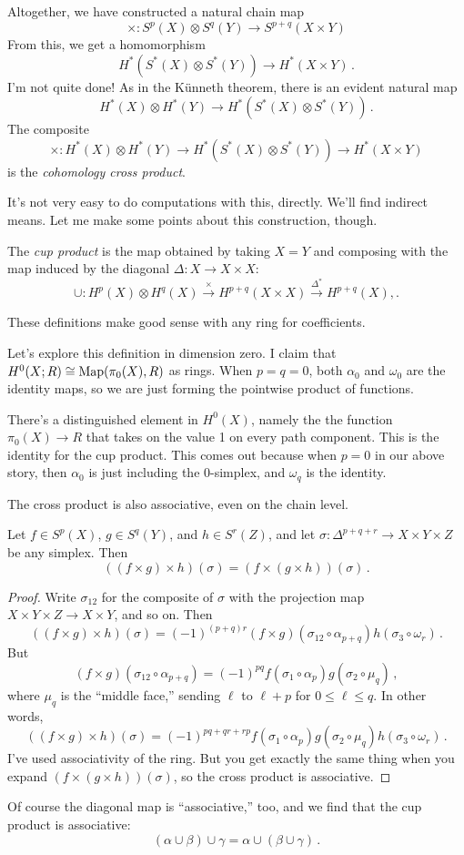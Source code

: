 Altogether, we have constructed a natural chain map
\[
\times:S^p(X)\otimes S^q(Y)\to S^{p+q}(X\times Y)
\]
From this, we get a homomorphism
\[
H^\ast(S^\ast(X)\otimes S^\ast(Y))\to H^\ast(X\times Y)\,.
\]
I'm not quite done! As in the K\"unneth theorem, there is an evident natural 
map 
\[
 H^\ast(X)\otimes H^\ast(Y)\to H^\ast(S^\ast(X)\otimes S^\ast(Y))\,.
\] 
The composite
\[
\times:H^\ast(X)\otimes H^\ast(Y)\to H^\ast(S^\ast(X)\otimes S^\ast(Y))\to H^\ast(X\times Y)
\]
 is the {\em cohomology cross product}.

It's not very easy to do computations with this, directly. We'll find indirect means. Let me make some points about this construction, though.
\begin{definition}
The {\em cup product} is the map obtained by taking $X=Y$ and composing with
the map induced by the diagonal $\Delta:X\to X\times X$:
\[
\cup:H^p(X)\otimes H^q(X)\xrightarrow{\times} H^{p+q}(X\times X)\xrightarrow{\Delta^\ast} H^{p+q}(X),.
\]
\end{definition}
These definitions make good sense with any ring for coefficients.

Let's explore this definition in dimension zero. 
I claim that $ H^0(X;R)\cong\operatorname{Map}(\pi_0(X),R)$ as rings. When $p=q=0$, both $\alpha_0$ and $\omega_0$ are the identity maps, so we are just forming the 
pointwise product of functions. 

There's a distinguished element in $H^0(X)$, namely the the function $\pi_0(X)\to R$ that takes on the value 1 on every path component. 
This is the identity for the cup product. This comes out because when $p=0$ in our above story, then $\alpha_0$ is just including the $0$-simplex, and $\omega_q$ is the identity. 

The cross product is also associative, even on the chain level. 
\begin{prop}
Let $f\in S^p(X)$, $g\in S^q(Y)$, and $h\in S^r(Z)$, and let 
$\sigma:\Delta^{p+q+r}\to X\times Y\times Z$ be any simplex. Then
\[
((f\times g)\times h)(\sigma)=(f\times(g\times h))(\sigma)\,.
\]
\end{prop}
\begin{proof}
Write $\sigma_{12}$ for the composite of $\sigma$ with the projection map
$X\times Y\times Z\to X\times Y$, and so on. Then
\[
((f\times g)\times h)(\sigma)=(-1)^{(p+q)r}
(f\times g)(\sigma_{12}\circ\alpha_{p+q})h(\sigma_3\circ\omega_r)\,.
\]
But 
\[(f\times g)(\sigma_{12}\circ\alpha_{p+q})=(-1)^{pq}
f(\sigma_1\circ\alpha_p)g(\sigma_2\circ\mu_q)\,,
\] 
where $\mu_q$ is the ``middle face,'' sending $\ell$ to $\ell+p$ for
$0\leq\ell\leq q$. In other words, 
\[
((f\times g)\times h)(\sigma)=(-1)^{pq+qr+rp}
f(\sigma_1\circ\alpha_p)g(\sigma_2\circ\mu_q)h(\sigma_3\circ\omega_r)\,.
\]
I've used associativity of the ring. But you get exactly the same thing when
you expand $(f\times(g\times h))(\sigma)$, so the cross product is associative.
\end{proof}

Of course the diagonal map is ``associative,'' too, and we find that the
cup product is associative:
\[
(\alpha\cup\beta)\cup\gamma=\alpha\cup(\beta\cup\gamma)\,.
\]

